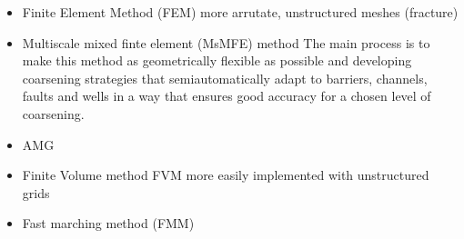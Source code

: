 \begin{itemize}
\begin{itemize}
\item Finite Element Method (FEM)
more arrutate, unstructured meshes (fracture)
    
\item Multiscale mixed finte element (MsMFE) method 
The main process is to make this method as geometrically flexible as possible and developing coarsening strategies that semiautomatically adapt to barriers, channels, faults and wells in a way that ensures good accuracy for a chosen level of coarsening.
\item AMG
\item Finite Volume method FVM
more easily implemented with unstructured grids
\item Fast marching method (FMM)
\end{itemize}
\end{itemize}
